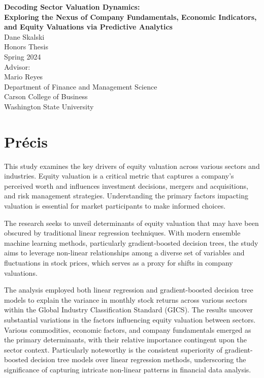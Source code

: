 \documentclass[12pt,a4paper,english]{article}
\begin{document}
\begin{titlepage}
	\thispagestyle{fancy}
	\vspace*{\fill}
	\begin{center}
		\textbf{\LARGE{Decoding Sector Valuation Dynamics:}}\\
		\textbf{\Large{Exploring the Nexus of Company Fundamentals, Economic Indicators, and Equity Valuations via Predictive Analytics}}\\
		\vspace{0.5cm}
		Dane Skalski\\
		Honors Thesis\\
		Spring 2024\\
		\vspace{0.5cm}
		Advisor:\\
		Mario Reyes\\
		Department of Finance and Management Science\\
		Carson College of Business\\
		Washington State University
	\end{center}
	\vspace*{\fill}
\end{titlepage}

\clearpage

\raggedright
\setlength{\parindent}{1cm}
\setcounter{secnumdepth}{0}

\pagestyle{main}

\section*{Précis}

This study examines the key drivers of equity valuation across various sectors and industries. Equity valuation is a critical metric that captures a company's perceived worth and influences investment decisions, mergers and acquisitions, and risk management strategies. Understanding the primary factors impacting valuation is essential for market participants to make informed choices.

The research seeks to unveil determinants of equity valuation that may have been obscured by traditional linear regression techniques. With modern ensemble machine learning methods, particularly gradient-boosted decision trees, the study aims to leverage non-linear relationships among a diverse set of variables and fluctuations in stock prices, which serves as a proxy for shifts in company valuations.

The analysis employed both linear regression and gradient-boosted decision tree models to explain the variance in monthly stock returns across various sectors within the Global Industry Classification Standard (GICS). The results uncover substantial variations in the factors influencing equity valuation between sectors. Various commodities, economic factors, and company fundamentals emerged as the primary determinants, with their relative importance contingent upon the sector context. Particularly noteworthy is the consistent superiority of gradient-boosted decision tree models over linear regression methods, underscoring the significance of capturing intricate non-linear patterns in financial data analysis.
\end{document}
